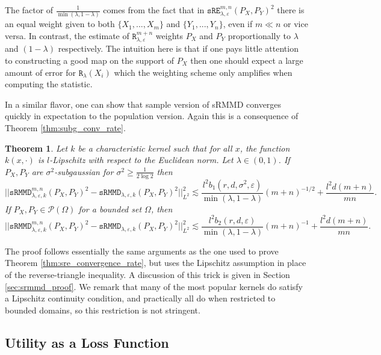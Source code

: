 \documentclass{article}
\newtheorem{theorem}{Theorem}
\theoremstyle{definition}
\newcommand{\sRn}{\mathtt{R}_{\lambda,\varepsilon}^{m+n}}
\newcommand{\R}{\mathtt{R}_{\lambda}}
\newcommand{\sREn}{\mathtt{sRE}_{\lambda, \varepsilon}^{m,n}}
\newcommand{\sRMMD}{\mathtt{sRMMD}_{\lambda,\varepsilon, k}}
\newcommand{\sRMMDn}{\mathtt{sRMMD}_{\lambda,\varepsilon, k}^{m,n}}
\begin{document}
The factor of $\frac{1}{\min(\lambda, 1-\lambda)}$ comes from the fact that in $\sREn(P_X,P_Y)^2$ there is an equal weight given to both $\{X_1,...,X_m\}$  and $\{Y_1,...,Y_n\}$, even if $m\ll n$  or vice versa. In contrast, the estimate of $\sRn$ weights $P_X$ and $P_Y$ proportionally to $\lambda$ and $(1-\lambda)$ respectively. The intuition here is that if one pays little attention to constructing a good map on the support of $P_X$ then one should expect a large amount of error for $\R(X_i)$ which the weighting scheme only amplifies when computing the statistic.

In a similar flavor, one can show that sample version of sRMMD converges quickly in expectation to the population version. Again this is a consequence of Theorem \ref{thm:subg_conv_rate}.

\begin{theorem} \label{thm:srmmd_convergence_rate}
    Let $k$ be a characteristic kernel such that for all $x$, the function $k(x,\cdot)$ is $l$-Lipschitz with respect to the Euclidean norm. Let $\lambda \in (0,1)$. If $P_X,P_Y$ are $\sigma^2$-subgaussian for $\sigma^2 \geq \frac{1}{2\log 2}$  then 
    \begin{equation*}
        ||\sRMMDn(P_X,P_Y)^2 - \sRMMD(P_X,P_Y)^2||_{L^2}^2 \lesssim  \frac{l^2b_1(r,d,\sigma^2,\varepsilon)}{\min(\lambda, 1-\lambda)}(m+n)^{-1/2} + \frac{l^2d(m+n)}{mn}.
    \end{equation*}
    If $P_X,P_Y \in \mathcal{P}(\Omega)$ for a bounded set $\Omega$, then
    \begin{equation*}
        ||\sRMMDn(P_X,P_Y)^2 - \sRMMD(P_X,P_Y)^2||_{L^2}^2 \lesssim  \frac{l^2b_2(r,d,\varepsilon)}{\min(\lambda, 1-\lambda)}(m+n)^{-1} + \frac{l^2d(m+n)}{mn}.
    \end{equation*}
\end{theorem}

The proof follows essentially the same arguments as the one used to prove Theorem \ref{thm:sre_convergence_rate}, but uses the Lipschitz assumption in place of the reverse-triangle inequality. A discussion of this trick is given in Section \ref{sec:srmmd_proof}.  We remark that many of the most popular kernels do satisfy a Lipschitz continuity condition, and practically all do when restricted to bounded domains, so this restriction is not stringent.
 
\subsection{Utility as a Loss Function}
\end{document}
